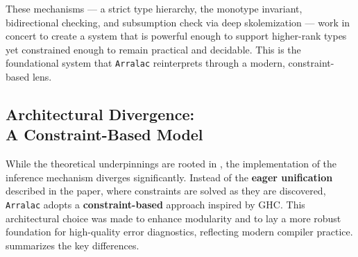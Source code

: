 These mechanisms --- a strict type hierarchy, the monotype invariant, bidirectional checking, and subsumption check via deep skolemization --- work in concert to create a system that is powerful enough to support higher-rank types yet constrained enough to remain practical and decidable. This is the foundational system that \texttt{Arralac} reinterprets through a modern, constraint-based lens.

\subsection{Architectural Divergence: \\ A Constraint-Based Model}
\label{sec:Design:ArralacApproach}

While the theoretical underpinnings are rooted in \cite{jones-practical-2007}, the implementation of the inference mechanism diverges significantly. Instead of the \textbf{eager unification} described in the paper, where constraints are solved as they are discovered, \texttt{Arralac} adopts a \textbf{constraint-based} approach inspired by GHC. This architectural choice was made to enhance modularity and to lay a more robust foundation for high-quality error diagnostics, reflecting modern compiler practice.  summarizes the key differences.

